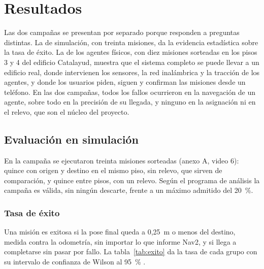 \chapter{Resultados}
\label{cap:resultados}

Las dos campañas se presentan por separado porque responden a preguntas distintas. La de simulación, con treinta misiones, da la evidencia estadística sobre la tasa de éxito. La de los agentes físicos, con diez misiones sorteadas en los pisos 3 y 4 del edificio Catalayud, muestra que el sistema completo se puede llevar a un edificio real, donde intervienen los sensores, la red inalámbrica y la tracción de los agentes, y donde los usuarios piden, siguen y confirman las misiones desde un teléfono. En las dos campañas, todos los fallos ocurrieron en la navegación de un agente, sobre todo en la precisión de su llegada, y ninguno en la asignación ni en el relevo, que son el núcleo del proyecto.

\section{Evaluación en simulación}
\label{sec:res-sim}

En la campaña se ejecutaron treinta misiones sorteadas (anexo A, video 6): quince con origen y destino en el mismo piso, sin relevo, que sirven de comparación, y quince entre pisos, con un relevo. Según el programa de análisis la campaña es válida, sin ningún descarte, frente a un máximo admitido del 20~\%.

\subsection{Tasa de éxito}

Una misión es exitosa si la pose final queda a 0,25~m o menos del destino, medida contra la odometría, sin importar lo que informe Nav2, y si llega a completarse sin pasar por fallo. La tabla~\ref{tab:exito} da la tasa de cada grupo con su intervalo de confianza de Wilson al 95~\% \autocite{wilson1927probable}.


